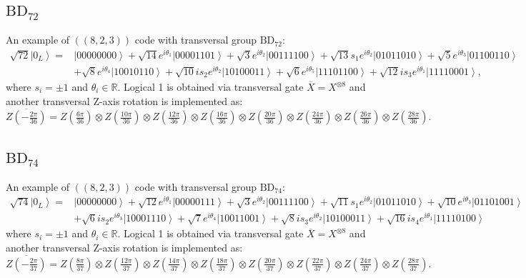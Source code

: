\documentclass[8pt]{article}
\theoremstyle{definition}
\begin{document}
\subsection{\texorpdfstring{$\mathrm{BD}_{72}$}{BD₇₂}}

An example of $((8,2,3))$ code with transversal group $\mathrm{BD}_{72}$:
\begin{align*}
    \sqrt{72}\left|0_{L}\right\rangle = & \left|00000000\right\rangle +\sqrt{14}e^{i\theta_{1}}\left|00001101\right\rangle +\sqrt{3}e^{i\theta_{2}}\left|00111100\right\rangle +\sqrt{13}s_{1}e^{i\theta_{2}}\left|01011010\right\rangle +\sqrt{5}e^{i\theta_{3}}\left|01100110\right\rangle \\&+\sqrt{8}e^{i\theta_{4}}\left|10010110\right\rangle +\sqrt{10}is_{2}e^{i\theta_{2}}\left|10100011\right\rangle +\sqrt{6}e^{i\theta_{5}}\left|11101100\right\rangle +\sqrt{12}is_{3}e^{i\theta_{1}}\left|11110001\right\rangle,
\end{align*}
where $s_i=\pm 1$ and $\theta_i\in\mathbb{R}$. Logical 1 is obtained via transversal gate $\overline{X}=X^{\otimes 8}$ and another transversal Z-axis rotation is implemented as:
\[ \overline{Z\left(-\tfrac{2\pi}{36}\right)}=Z\left(\tfrac{6\pi}{36}\right)\otimes Z\left(\tfrac{10\pi}{36}\right)\otimes Z\left(\tfrac{12\pi}{36}\right)\otimes Z\left(\tfrac{16\pi}{36}\right)\otimes Z\left(\tfrac{20\pi}{36}\right)\otimes Z\left(\tfrac{24\pi}{36}\right)\otimes Z\left(\tfrac{26\pi}{36}\right)\otimes Z\left(\tfrac{28\pi}{36}\right). \]

\subsection{\texorpdfstring{$\mathrm{BD}_{74}$}{BD₇₄}}

An example of $((8,2,3))$ code with transversal group $\mathrm{BD}_{74}$:
\begin{align*}
    \sqrt{74}\left|0_{L}\right\rangle = & \left|00000000\right\rangle +\sqrt{12}e^{i\theta_{1}}\left|00000111\right\rangle +\sqrt{3}e^{i\theta_{2}}\left|00111100\right\rangle +\sqrt{11}s_{1}e^{i\theta_{2}}\left|01011010\right\rangle +\sqrt{10}e^{i\theta_{3}}\left|01101001\right\rangle \\&+\sqrt{6}is_{2}e^{i\theta_{3}}\left|10001110\right\rangle +\sqrt{7}e^{i\theta_{4}}\left|10011001\right\rangle +\sqrt{8}is_{3}e^{i\theta_{2}}\left|10100011\right\rangle +\sqrt{16}is_{4}e^{i\theta_{1}}\left|11110100\right\rangle
\end{align*}
where $s_i=\pm 1$ and $\theta_i\in\mathbb{R}$. Logical 1 is obtained via transversal gate $\overline{X}=X^{\otimes 8}$ and another transversal Z-axis rotation is implemented as:
\[ \overline{Z\left(-\tfrac{2\pi}{37}\right)}=Z\left(\tfrac{8\pi}{37}\right)\otimes Z\left(\tfrac{12\pi}{37}\right)\otimes Z\left(\tfrac{14\pi}{37}\right)\otimes Z\left(\tfrac{18\pi}{37}\right)\otimes Z\left(\tfrac{20\pi}{37}\right)\otimes Z\left(\tfrac{22\pi}{37}\right)\otimes Z\left(\tfrac{24\pi}{37}\right)\otimes Z\left(\tfrac{28\pi}{37}\right). \]
\end{document}
